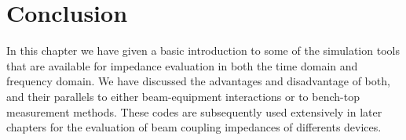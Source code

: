 \section{Conclusion}

In this chapter we have given a basic introduction to some of the simulation tools that are available for impedance evaluation in both the time domain and frequency domain. We have discussed the advantages and disadvantage of both, and their parallels to either beam-equipment interactions or to bench-top measurement methods. These codes are subsequently used extensively in later chapters for the evaluation of beam coupling impedances of differents devices.